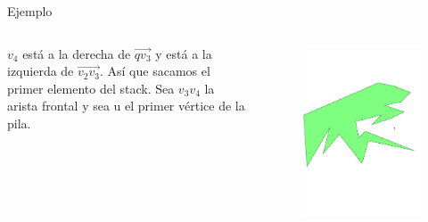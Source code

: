\documentclass[aspectratio=169,xcolor=dvipsnames, t]{beamer}
\begin{document}
\begin{frame}{Ejemplo}
  \begin{columns}
    \begin{column}{0.3\textwidth}
      \raggedright %
      $v_{4}$ está a la derecha de $\overrightarrow{qv_{3}}$ y está a la izquierda de $\overrightarrow{v_{2}v_{3}}$. Así que sacamos el primer elemento del stack. Sea $v_{3}v_{4}$ la arista frontal y sea u el primer vértice de la pila.
    \end{column}
    \begin{column}{0.7\textwidth}
      \vspace{-2.5cm} %
      \begin{figure}
        \centering
        \includegraphics[width=1\linewidth, height=.95\textheight, page=13, keepaspectratio]{IPE/point_visibility.pdf}
      \end{figure}
    \end{column}
  \end{columns}
\end{frame}
\end{document}
